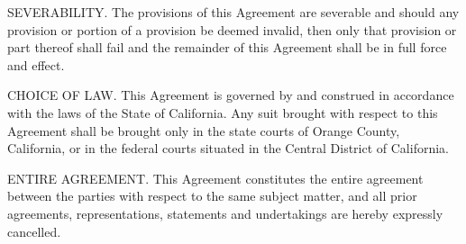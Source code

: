 \begin{DoxyEnumerate}
\item S\+E\+V\+E\+R\+A\+B\+I\+L\+I\+TY. The provisions of this Agreement are severable and should any provision or portion of a provision be deemed invalid, then only that provision or part thereof shall fail and the remainder of this Agreement shall be in full force and effect.
\item C\+H\+O\+I\+CE OF L\+AW. This Agreement is governed by and construed in accordance with the laws of the State of California. Any suit brought with respect to this Agreement shall be brought only in the state courts of Orange County, California, or in the federal courts situated in the Central District of California.
\item E\+N\+T\+I\+RE A\+G\+R\+E\+E\+M\+E\+NT. This Agreement constitutes the entire agreement between the parties with respect to the same subject matter, and all prior agreements, representations, statements and undertakings are hereby expressly cancelled. 
\end{DoxyEnumerate}